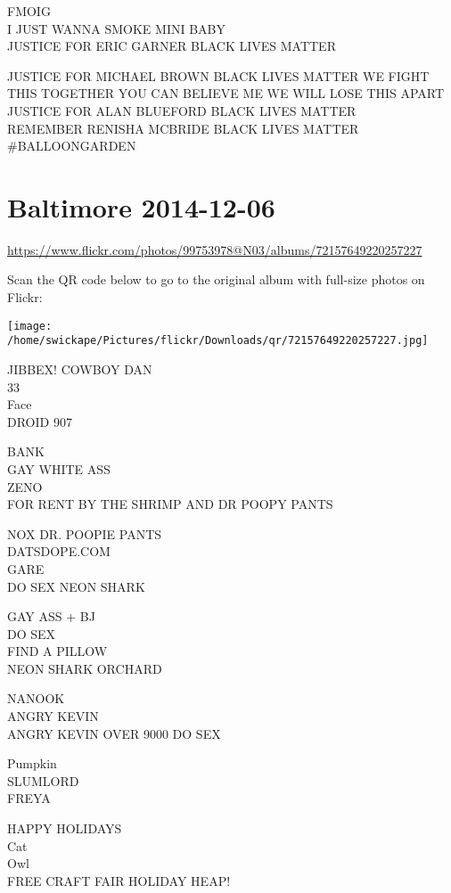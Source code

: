 \documentclass[10pt,letterpaper]{article}
\begin{document}
FMOIG\\
I JUST WANNA SMOKE MINI BABY\\
JUSTICE FOR ERIC GARNER BLACK LIVES MATTER

JUSTICE FOR MICHAEL BROWN BLACK LIVES MATTER WE FIGHT THIS TOGETHER YOU CAN BELIEVE ME WE WILL LOSE THIS APART\\
JUSTICE FOR ALAN BLUEFORD BLACK LIVES MATTER\\
REMEMBER RENISHA MCBRIDE BLACK LIVES MATTER\\
\#BALLOONGARDEN
\pagebreak

\section*{Baltimore 2014-12-06}

\url{https://www.flickr.com/photos/99753978@N03/albums/72157649220257227}

Scan the QR code below to go to the original album with full-size photos on Flickr:

\texttt{[image: /home/swickape/Pictures/flickr/Downloads/qr/72157649220257227.jpg]}
\pagebreak

JIBBEX! COWBOY DAN\\
33\\
Face\\
DROID 907

BANK\\
GAY WHITE ASS\\
ZENO\\
FOR RENT BY THE SHRIMP AND DR POOPY PANTS

NOX DR. POOPIE PANTS\\
DATSDOPE.COM\\
GARE\\
DO SEX NEON SHARK

GAY ASS + BJ\\
DO SEX\\
FIND A PILLOW\\
NEON SHARK ORCHARD

NANOOK\\
ANGRY KEVIN\\
ANGRY KEVIN OVER 9000 DO SEX

Pumpkin\\
SLUMLORD\\
FREYA

HAPPY HOLIDAYS\\
Cat\\
Owl\\
FREE CRAFT FAIR HOLIDAY HEAP!
\end{document}
